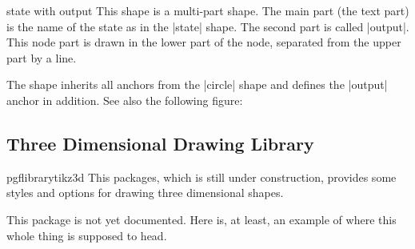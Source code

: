 \begin{shape}{state with output}
  This shape is a multi-part shape. The main part (the text part) is
  the name of the state as in the |state| shape. The second part is
  called |output|. This node part is drawn in the lower part of the
  node, separated from the upper part by a line.
  
\begin{codeexample}[]
\end{codeexample}

  The shape inherits all anchors from the |circle| shape and defines
  the |output| anchor in addition. See also the
  following figure:
\begin{codeexample}[]
\Huge
{}
\end{codeexample}
\end{shape}


\subsection{Three Dimensional Drawing Library}

\begin{package}{pgflibrarytikz3d}
  This packages, which is still under construction, provides some
  styles and options for drawing three dimensional shapes.
\end{package}

This package is not yet documented. Here is, at least, an example of
where this whole thing is supposed to head.

